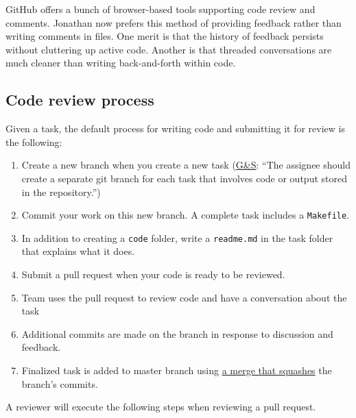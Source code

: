 GitHub offers a bunch of browser-based tools supporting code review and comments.
Jonathan now prefers this method of providing feedback rather than writing comments in files.
One merit is that the history of feedback persists without cluttering up active code.
Another is that threaded conversations are much cleaner than writing back-and-forth within code.

\subsection{Code review process}\label{code_review_process}
Given a task, the default process for writing code and submitting it for review is the following:
\begin{enumerate}
\item Create a new branch when you create a new task (\href{https://github.com/gslab-econ/ra-manual/wiki/Tasks}{G\&S}: ``The assignee should create a separate git branch for each task that involves code or output stored in the repository.'')
\item Commit your work on this new branch. A complete task includes a \texttt{Makefile}.
\item In addition to creating a \texttt{code} folder, write a \texttt{readme.md} in the task folder that explains what it does.
\item Submit a pull request when your code is ready to be reviewed.
\item Team uses the pull request to review code and have a conversation about the task
\item Additional commits are made on the branch in response to discussion and feedback.
\item Finalized task is added to master branch using \href{https://docs.github.com/en/pull-requests/collaborating-with-pull-requests/incorporating-changes-from-a-pull-request/about-pull-request-merges#squash-and-merge-your-commits}{a merge that squashes} the branch's commits.
\end{enumerate}

A reviewer will execute the following steps when reviewing a pull request.

